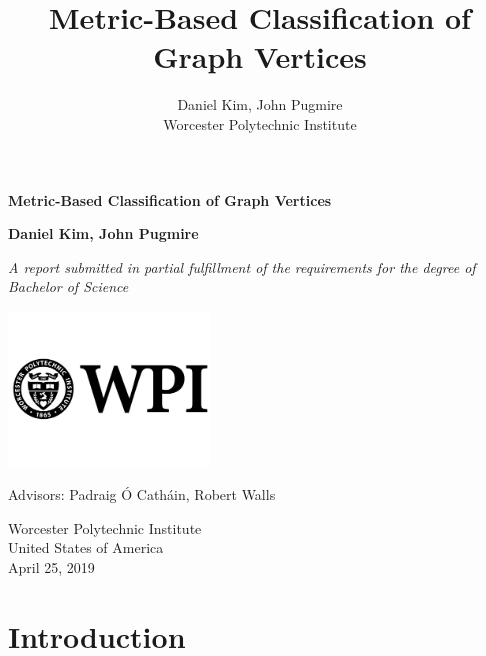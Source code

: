 \documentclass[11pt,oneside]{report}
\theoremstyle{definition}
\begin{document}
\title{Metric-Based Classification of Graph Vertices}
\author{Daniel Kim, John Pugmire\\Worcester Polytechnic Institute\\}


\begin{titlepage}
    \begin{center}
        \vspace*{1cm}
 
        \Huge
        \textbf{Metric-Based Classification of Graph Vertices}
 
        \vspace{0.5cm}
        \LARGE
 
        \vspace{1.5cm}
 
        \textbf{Daniel Kim, John Pugmire}
 
        \vfill

        \large
 
        \textit{A report submitted in partial fulfillment of the requirements for the degree of
          Bachelor of Science}
 
        \vspace{0.8cm}
 
        \includegraphics[width=0.4\textwidth]{university}
 
        \Large
        Advisors: Padraig Ó Catháin, Robert Walls \\
        \vspace{0.5cm}
        \large

        Worcester Polytechnic Institute\\
        United States of America\\
        April 25, 2019
 
    \end{center}
\end{titlepage}

\tableofcontents


\chapter{Introduction}
\label{chap:intro}

\end{document}
